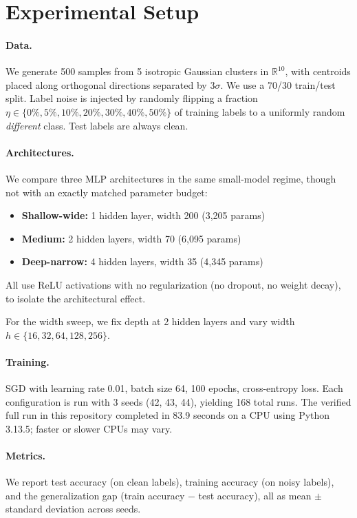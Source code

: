 \documentclass[11pt,a4paper]{article}
\begin{document}
\section{Experimental Setup}

\paragraph{Data.}
We generate 500 samples from 5 isotropic Gaussian clusters in $\mathbb{R}^{10}$, with centroids placed along orthogonal directions separated by $3\sigma$.
We use a 70/30 train/test split.
Label noise is injected by randomly flipping a fraction $\eta \in \{0\%, 5\%, 10\%, 20\%, 30\%, 40\%, 50\%\}$ of training labels to a uniformly random \emph{different} class.
Test labels are always clean.

\paragraph{Architectures.}
We compare three MLP architectures in the same small-model regime, though not with an exactly matched parameter budget:
\begin{itemize}
    \item \textbf{Shallow-wide:} 1 hidden layer, width 200 (3,205 params)
    \item \textbf{Medium:} 2 hidden layers, width 70 (6,095 params)
    \item \textbf{Deep-narrow:} 4 hidden layers, width 35 (4,345 params)
\end{itemize}
All use ReLU activations with no regularization (no dropout, no weight decay), to isolate the architectural effect.

For the width sweep, we fix depth at 2 hidden layers and vary width $h \in \{16, 32, 64, 128, 256\}$.

\paragraph{Training.}
SGD with learning rate 0.01, batch size 64, 100 epochs, cross-entropy loss.
Each configuration is run with 3 seeds (42, 43, 44), yielding 168 total runs.
The verified full run in this repository completed in 83.9 seconds on a CPU using Python 3.13.5; faster or slower CPUs may vary.

\paragraph{Metrics.}
We report test accuracy (on clean labels), training accuracy (on noisy labels), and the generalization gap (train accuracy $-$ test accuracy), all as mean $\pm$ standard deviation across seeds.
\end{document}
